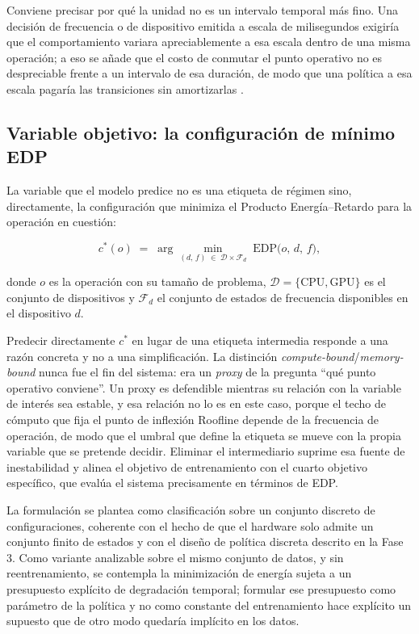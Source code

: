 \documentclass[12pt,oneside,spanish]{book}
\begin{document}
Conviene precisar por qué la unidad no es un intervalo temporal más fino. Una decisión de frecuencia o de dispositivo emitida a escala de milisegundos exigiría que el comportamiento variara apreciablemente a esa escala dentro de una misma operación; a eso se añade que el costo de conmutar el punto operativo no es despreciable frente a un intervalo de esa duración, de modo que una política a esa escala pagaría las transiciones sin amortizarlas \cite{Hebbar2022,Velicka2025}.

\subsection{Variable objetivo: la configuración de mínimo EDP}
\label{sec:fase2-target}

La variable que el modelo predice no es una etiqueta de régimen sino, directamente, la configuración que minimiza el Producto Energía--Retardo para la operación en cuestión:

\begin{equation}
\label{eq:target-selector}
c^{*}(o) \;=\; \arg\min_{(d,\,f)\;\in\;\mathcal{D}\times\mathcal{F}_d} \; \mathrm{EDP}\bigl(o,\,d,\,f\bigr),
\end{equation}

donde $o$ es la operación con su tamaño de problema, $\mathcal{D}=\{\text{CPU},\text{GPU}\}$ es el conjunto de dispositivos y $\mathcal{F}_d$ el conjunto de estados de frecuencia disponibles en el dispositivo $d$.

Predecir directamente $c^{*}$ en lugar de una etiqueta intermedia responde a una razón concreta y no a una simplificación. La distinción \textit{compute-bound}/\textit{memory-bound} nunca fue el fin del sistema: era un \textit{proxy} de la pregunta ``qué punto operativo conviene''. Un proxy es defendible mientras su relación con la variable de interés sea estable, y esa relación no lo es en este caso, porque el techo de cómputo que fija el punto de inflexión Roofline depende de la frecuencia de operación, de modo que el umbral que define la etiqueta se mueve con la propia variable que se pretende decidir. Eliminar el intermediario suprime esa fuente de inestabilidad y alinea el objetivo de entrenamiento con el cuarto objetivo específico, que evalúa el sistema precisamente en términos de EDP.

La formulación se plantea como clasificación sobre un conjunto discreto de configuraciones, coherente con el hecho de que el hardware solo admite un conjunto finito de estados y con el diseño de política discreta descrito en la Fase 3. Como variante analizable sobre el mismo conjunto de datos, y sin reentrenamiento, se contempla la minimización de energía sujeta a un presupuesto explícito de degradación temporal; formular ese presupuesto como parámetro de la política y no como constante del entrenamiento hace explícito un supuesto que de otro modo quedaría implícito en los datos.
\end{document}
